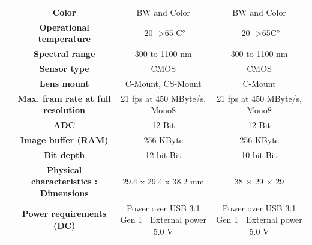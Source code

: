 \begin{table}[H]
{\begin{tabular}{ccc|cc|cc|}
\multicolumn{1}{|c|}{} &
  \multicolumn{2}{c|}{\cellcolor[HTML]{EFEFEF}\textbf{Color}} &
  \multicolumn{2}{c|}{\cellcolor[HTML]{EFEFEF}BW and Color} &
  \multicolumn{2}{c|}{\cellcolor[HTML]{EFEFEF}BW and Color} \\
\multicolumn{1}{|c|}{} &
  \multicolumn{2}{c|}{\textbf{Operational temperature}} &
  \multicolumn{2}{c|}{-20 -\textgreater 65 C°} &
  \multicolumn{2}{c|}{-20 -\textgreater 65C°} \\
\multicolumn{1}{|c|}{} &
  \multicolumn{2}{c|}{\cellcolor[HTML]{EFEFEF}\textbf{Spectral range}} &
  \multicolumn{2}{c|}{\cellcolor[HTML]{EFEFEF}300 to 1100 nm} &
  \multicolumn{2}{c|}{\cellcolor[HTML]{EFEFEF}300 to 1100 nm} \\
\multicolumn{1}{|c|}{} &
  \multicolumn{2}{c|}{\textbf{Sensor type}} &
  \multicolumn{2}{c|}{CMOS} &
  \multicolumn{2}{c|}{CMOS} \\
\multicolumn{1}{|c|}{} &
  \multicolumn{2}{c|}{\cellcolor[HTML]{EFEFEF}\textbf{Lens mount}} &
  \multicolumn{2}{c|}{\cellcolor[HTML]{EFEFEF}C-Mount, CS-Mount} &
  \multicolumn{2}{c|}{\cellcolor[HTML]{EFEFEF}C-Mount} \\
\multicolumn{1}{|c|}{} &
  \multicolumn{2}{c|}{\textbf{Max. fram rate at full resolution}} &
  \multicolumn{2}{c|}{21 fps at 450 MByte/s, Mono8} &
  \multicolumn{2}{c|}{21 fps at 450 MByte/s, Mono8} \\
\multicolumn{1}{|c|}{} &
  \multicolumn{2}{c|}{\cellcolor[HTML]{EFEFEF}\textbf{ADC}} &
  \multicolumn{2}{c|}{\cellcolor[HTML]{EFEFEF}12 Bit} &
  \multicolumn{2}{c|}{\cellcolor[HTML]{EFEFEF}12 Bit} \\
\multicolumn{1}{|c|}{} &
  \multicolumn{2}{c|}{\textbf{Image buffer (RAM)}} &
  \multicolumn{2}{c|}{256 KByte} &
  \multicolumn{2}{c|}{256 KByte} \\
\multicolumn{1}{|c|}{} &
  \multicolumn{2}{c|}{\cellcolor[HTML]{EFEFEF}\textbf{Bit depth}} &
  \multicolumn{2}{c|}{\cellcolor[HTML]{EFEFEF}12-bit Bit} &
  \multicolumn{2}{c|}{\cellcolor[HTML]{EFEFEF}10-bit Bit} \\
\multicolumn{1}{|c|}{} &
  \multicolumn{2}{c|}{\textbf{Physical characteristics : Dimensions}} &
  \multicolumn{2}{c|}{29.4 x 29.4 x 38.2 mm} &
  \multicolumn{2}{c|}{38 $\times$ 29 $\times$ 29} \\
\multicolumn{1}{|c|}{} &
  \multicolumn{2}{c|}{\cellcolor[HTML]{EFEFEF}\textbf{Power requirements (DC)}} &
  \multicolumn{2}{c|}{\cellcolor[HTML]{EFEFEF}Power over USB 3.1 Gen 1 | External power 5.0 V} &
  \multicolumn{2}{c|}{\cellcolor[HTML]{EFEFEF}Power over USB 3.1 Gen 1 | External power 5.0 V} \\

\end{tabular}}
\end{table}
